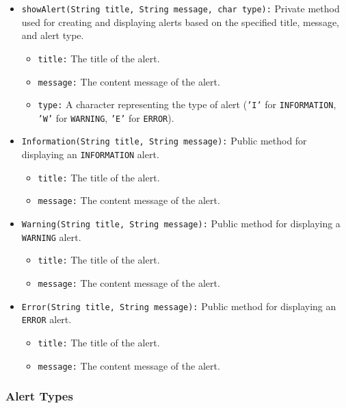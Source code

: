 \documentclass{article}
\begin{document}
\begin{itemize}
    \item \texttt{showAlert(String title, String message, char type):} Private method used for creating and displaying alerts based on the specified title, message, and alert type.
    \begin{itemize}
        \item \texttt{title:} The title of the alert.
        \item \texttt{message:} The content message of the alert.
        \item \texttt{type:} A character representing the type of alert (\texttt{'I'} for \texttt{INFORMATION}, \texttt{'W'} for \texttt{WARNING}, \texttt{'E'} for \texttt{ERROR}).
    \end{itemize}
    
    \item \texttt{Information(String title, String message):} Public method for displaying an \texttt{INFORMATION} alert.
    \begin{itemize}
        \item \texttt{title:} The title of the alert.
        \item \texttt{message:} The content message of the alert.
    \end{itemize}
    
    \item \texttt{Warning(String title, String message):} Public method for displaying a \texttt{WARNING} alert.
    \begin{itemize}
        \item \texttt{title:} The title of the alert.
        \item \texttt{message:} The content message of the alert.
    \end{itemize}
    
    \item \texttt{Error(String title, String message):} Public method for displaying an \texttt{ERROR} alert.
    \begin{itemize}
        \item \texttt{title:} The title of the alert.
        \item \texttt{message:} The content message of the alert.
    \end{itemize}
\end{itemize}

\subsubsection{Alert Types}
\end{document}
